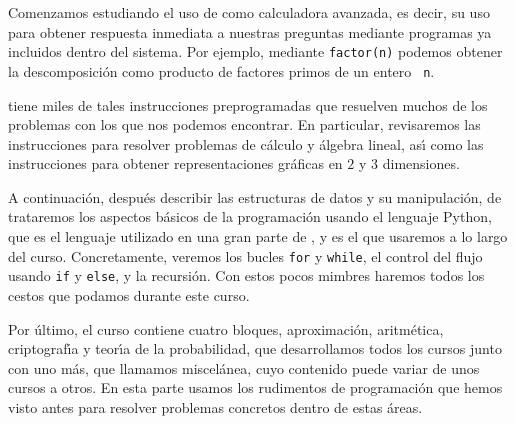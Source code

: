 Comenzamos estudiando el uso de {\sage} como calculadora avanzada, es decir, su
uso
para obtener respuesta inmediata a nuestras preguntas mediante programas ya
incluidos dentro del sistema. Por ejemplo, mediante {\tt factor(n)} podemos
obtener la descomposici\'on como producto de factores primos de un entero {\tt
n}. 

{\sage} tiene miles de tales instrucciones preprogramadas que resuelven muchos
de
los problemas con los que nos podemos encontrar. En particular, revisaremos las
instrucciones para resolver problemas de c\'alculo y \'algebra lineal, as\'{\i}
como las instrucciones para obtener representaciones gr\'aficas en $2$ y $3$
dimensiones.


A continuaci\'on, despu\'es describir las estructuras de datos y su manipulaci\'on,  de  trataremos los aspectos b\'asicos de la programaci\'on usando
el lenguaje Python, que es el lenguaje utilizado en una gran parte de
{\sage}, y es el que usaremos a lo largo del curso.
Concretamente, veremos los bucles {\tt for} y {\tt while}, el control del flujo
usando {\tt if} y {\tt else}, y la recursi\'on. Con estos pocos mimbres haremos
todos los cestos que podamos durante este curso. 

Por \'ultimo, el curso contiene cuatro  bloques, aproximaci\'on, aritm\'etica,
criptograf\'{\i}a y
teor\'{\i}a de la probabilidad, que desarrollamos todos los cursos junto con uno
m\'as, que llamamos miscel\'anea, cuyo contenido puede variar de unos cursos a
otros. En esta parte usamos los rudimentos de programaci\'on que hemos visto
antes para resolver problemas concretos dentro de estas \'areas. 

